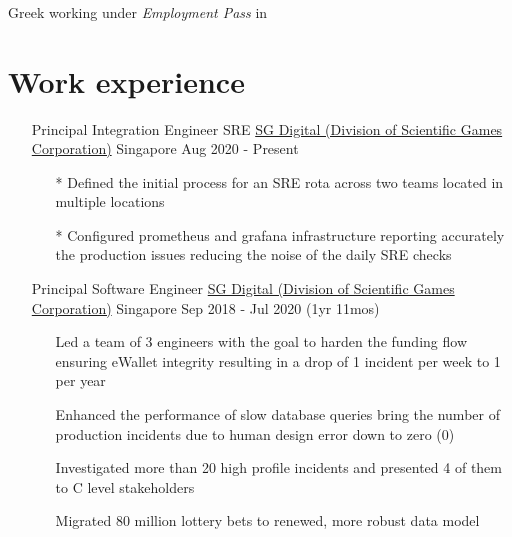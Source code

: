 \documentclass{CVSoftwareEngineer}
\begin{document}
	\section{\textbf{\cvname}}
	\begin{center}
		\href{mailto:\cvmail}{\cvmail} \space \textbar \space \cvlinkedin \space \textbar \space \cvgithub \\
		Greek working under \textit{Employment Pass} in \cvaddress
	\end{center}

	\section{Work experience}
	\begin{enumerate}[labelwidth=!, labelindent=0pt, leftmargin=*, rightmargin=15pt]
		\item[] \cvExperience
			{Principal Integration Engineer \textbar SRE}
			{\href{https://www.sgdigital.com/}{SG Digital (Division of Scientific Games Corporation)}}
			{Singapore}
			{Aug 2020 - Present}
			{\begin{enumerate}[labelwidth=!, labelindent=0pt, nosep, leftmargin=*]
					\item[*] Defined the initial process for an SRE rota across two teams located in multiple locations
					\item[*] Configured prometheus and grafana infrastructure reporting accurately the production issues reducing the noise of the daily SRE checks
				\end{enumerate}
			}

		\item[] \cvExperience
			{Principal Software Engineer}
			{\href{https://www.sgdigital.com/}{SG Digital (Division of Scientific Games Corporation)}}
			{Singapore}
			{Sep 2018 - Jul 2020 (1yr 11mos)}
			{\begin{enumerate}[labelwidth=!, labelindent=0pt, nosep, leftmargin=*]
					\item[\textasteriskcentered] Led a team of 3 engineers with the goal to harden the
						funding flow ensuring eWallet integrity resulting in a drop of 1 incident per week
						to 1 per year
					\item[\textasteriskcentered] Enhanced the performance of slow database queries bring
						the number of production incidents due to human design error down to zero (0)
					\item[\textasteriskcentered] Investigated more than 20 high profile incidents and
						presented 4 of them to C level stakeholders
					\item[\textasteriskcentered] Migrated 80 million lottery bets to renewed,
						more robust data model
				\end{enumerate}
			}


\end{enumerate}
\end{document}
